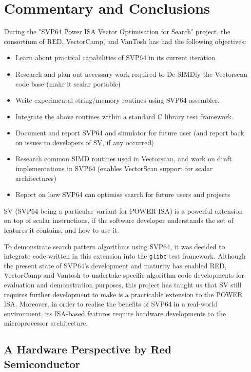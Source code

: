 \chapter{Commentary and Conclusions}

During the "SVP64 Power ISA Vector Optimisation for Search" project, the
consortium of RED, VectorCamp, and VanTosh has had the following objectives:

\begin{itemize}
  \item Learn about practical capabilities of SVP64 in its current iteration
  \item Research and plan out necessary work required to De-SIMDfy the
        Vectorscan code base (make it scalar portable)
  \item Write experimental string/memory routines using SVP64 assembler.
  \item Integrate the above routines within a standard C library test framework.
  \item Document and report SVP64 and simulator for future user (and report
        back on issues to developers of SV, if any occurred)
  \item Research common SIMD routines used in Vectorscan, and work on draft
        implementations in SVP64 (enables VectorScan support for scalar
        architectures)
  \item Report on how SVP64 can optimise search for future users and projects
\end{itemize}

\acrfull{SV} (\acrshort{SVP64} being a particular variant for \acrshort{POWER}
ISA) is a powerful extension on top of scalar instructions, if the software
developer understands the set of features it contains, and how to use it.

To demonstrate search pattern algorithms using \acrshort{SVP64}, it was decided
to integrate code written in this extension into the \texttt{glibc}
test framework.
Although the present state of SVP64's development and maturity has enabled RED,
VectorCamp and Vantosh to undertake specific algorithm code developments for
evaluation and demonstration purposes, this project has taught us that
\acrshort{SV} still requires further development to make is a practicable
extension to the POWER ISA. Moreover, in order to realise the benefits of SVP64
in a real-world environment, its ISA-based features require hardware
developments to the microprocessor architecture.

\section{A Hardware Perspective by Red Semiconductor}

